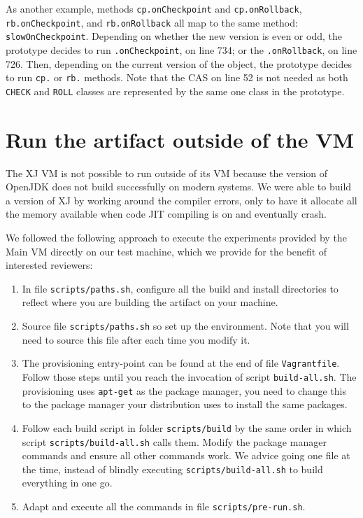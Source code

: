 \documentclass[12pt]{article}
\newcommand{\host}[1]{\colorbox{blue!20}{\texttt{\color{black}#1}}}
\begin{document}
As another example, methods \texttt{cp.onCheckpoint} and \texttt{cp.onRollback},
\texttt{rb.onCheckpoint}, and \texttt{rb.onRollback} all map to the same method:
\texttt{slowOnCheckpoint}.  Depending on whether the new version is even or odd,
the prototype decides to run \texttt{.onCheckpoint}, on line 734; or the
\texttt{.onRollback}, on line 726.  Then, depending on the current version of
the object, the prototype decides to run \texttt{cp.} or \texttt{rb.} methods.
Note that the CAS on line 52 is not needed as both \texttt{CHECK} and
\texttt{ROLL} classes are represented by the same one class in the prototype.

\section{Run the artifact outside of the VM}
\label{sec:extract}

The XJ VM is not possible to run outside of its VM because the version of
OpenJDK does not build successfully on modern systems.  We were able to build a
version of XJ by working around the compiler errors, only to have it allocate
all the memory available when code JIT compiling is on and eventually crash.

We followed the following approach to execute the experiments provided by the
Main VM directly on our test machine, which we provide for the benefit of interested reviewers:

\begin{enumerate}

    \item In file \host{scripts/paths.sh}, configure all the build and install
        directories to reflect where you are building the artifact on your
        machine.

    \item Source file \host{scripts/paths.sh} so set up the environment.  Note
        that you will need to source this file after each time you modify it.

    \item The provisioning entry-point can be found at the end of file
        \host{Vagrantfile}.  Follow those steps until you reach the invocation
        of script \texttt{build-all.sh}. The provisioning uses \texttt{apt-get}
        as the package manager, you need to change this to the package manager
        your distribution uses to install the same packages.

    \item Follow each build script in folder \host{scripts/build} by the same
        order in which script \host{scripts/build-all.sh} calls them.  Modify
        the package manager commands and ensure all other commands work.  We
        advice going one file at the time, instead of blindly executing
        \host{scripts/build-all.sh} to build everything in one go.

    \item Adapt and execute all the commands in file
        \host{scripts/pre-run.sh}.

\end{enumerate}
\end{document}
